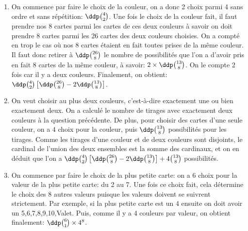 \documentclass[a4paper, 11pt,reqno]{article}
\begin{document}
\begin{correction}
\begin{enumerate}
\item On commence par faire le choix de la couleur, on a donc 2 choix parmi 4 sans ordre et sans r\'ep\'etition: $\ddp \binom{4}{2}$. Une fois le choix de la couleur fait, il faut prendre nos 8 cartes parmi les cartes de ces deux couleurs \`a savoir on doit prendre 8 cartes parmi les 26 cartes des deux couleurs choisies. On a compt\'e en trop le cas o\`u nos 8 cartes \'etaient en fait toutes prises de la m\^eme couleur. Il faut donc retirer \`a $\ddp \binom{26}{8}$ le nombre de possibilit\'es que l'on a d'avoir pris en fait 8 cartes de la m\^eme couleur, \`a savoir: $2\times\ddp \binom{13}{8}$. On le compte 2 fois car il y a deux couleurs. Finalement, on obtient: $\ddp \binom{4}{2}\left\lbrack \ddp \binom{26}{8}-2\ddp \binom{13}{8}   \right\rbrack$.
\item On veut choisir au plus deux couleurs, c'est-\`a-dire exactement une ou bien exactement deux. On a calcul\'e le nombre de tirages avec exactement deux couleurs \`a la question pr\'ec\'edente. De plus, pour choisir des cartes d'une seule couleur, on a $4$ choix pour la couleur, puis $\ddp \binom{13}{8}$ possibilit\'es pour les tirages. Comme les tirages d'une couleur et de deux couleurs sont disjoints, le cardinal de l'union des deux ensembles est la somme des cardinaux, et on en d\'eduit que l'on a $\ddp \binom{4}{2}\left\lbrack \ddp \binom{26}{8}-2\ddp \binom{13}{8}   \right\rbrack + 4 \binom{13}{8}$ possibilit\'es.
\item On commence par faire le choix de la plus petite carte: on a 6 choix pour la valeur de la plus petite carte: du 2 au 7. Une fois ce choix fait, cela d\'etermine le choix des 8 autres valeurs puisque les valeurs doivent se suivrent strictement. Par exemple, si la plus petite carte est un 4 ensuite on doit avoir un 5,6,7,8,9,10,Valet. Puis, comme il y a 4 couleurs par valeur, on obtient finalement: $\ddp \binom{6}{1}\times 4^{8}$.
\end{enumerate}
\end{correction}
\end{document}
